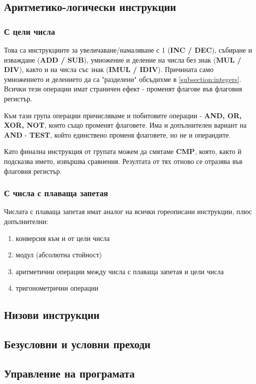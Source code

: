 \documentclass[fleqn,12pt]{article}
\begin{document}
\subsection{Аритметико-логически инструкции}
\subsubsection{С цели числа}
Това са инструкциите за увеличаване/намаляване с 1 (\textbf{INC / DEC}), събиране и изваждане (\textbf{ADD / SUB}),
умножение и деление на числа без знак (\textbf{MUL / DIV}), както и на числа със знак (\textbf{IMUL / IDIV}).
Причината само умножението и делението да са "разделени" обсъдихме в \ref{subsection:integers}.
Всички тези операции имат страничен ефект - променят флагове във флаговия регистър.

Към тази група операции причисляваме и побитовите операции - \textbf{AND, OR, XOR, NOT}, които също променят флаговете.
Има и допълнителен вариант на \textbf{AND} - \textbf{TEST}, който единствено променя флаговете, но не и операндите.

Като финална инструкция от групата можем да смятаме \textbf{CMP}, която, както й подсказва името, извършва сравнения.
Резултата от тях отново се отразява във флаговия регистър.

\subsubsection{С числа с плаваща запетая}
Числата с плаваща запетая имат аналог на всички гореописани инструкции, плюс допълнителни:
\begin{enumerate}
    \item конверсия към и от цели числа
    \item модул (абсолютна стойност)
    \item аритметични операции между числа с плаваща запетая и цели числа
    \item тригонометрични операции
\end{enumerate}

\subsection{Низови инструкции}
\subsection{Безусловни и условни преходи}
\subsection{Управление на програмата}
\end{document}
